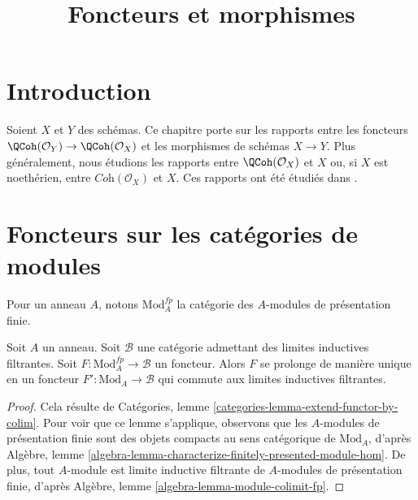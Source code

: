 

%


\title{Foncteurs et morphismes}


\maketitle

\label{section-phantom}

\tableofcontents

\section{Introduction}
\label{section-introduction}

\noindent
Soient $X$ et $Y$ des schémas. Ce chapitre porte sur les rapports
entre les foncteurs $\QCoh(\mathcal{O}_Y) \to \QCoh(\mathcal{O}_X)$ et les
morphismes de schémas $X \to Y$. Plus généralement, nous étudions les
rapports entre $\QCoh(\mathcal{O}_X)$ et $X$ ou, si $X$ est noethérien,
entre $\textit{Coh}(\mathcal{O}_X)$ et $X$.
Ces rapports ont été étudiés dans \cite{Gabriel}.






\section{Foncteurs sur les catégories de modules}
\label{section-preliminary}

\noindent
Pour un anneau $A$, notons $\text{Mod}^{fp}_A$ la catégorie des
$A$-modules de présentation finie.

\begin{lemma}
\label{lemma-functor-on-fp-modules}
Soit $A$ un anneau. Soit $\mathcal{B}$ une catégorie admettant des limites
inductives filtrantes. Soit $F : \text{Mod}^{fp}_A \to \mathcal{B}$ un foncteur. Alors $F$
se prolonge de manière unique en un foncteur $F' : \text{Mod}_A \to \mathcal{B}$
qui commute aux limites inductives filtrantes.
\end{lemma}

\begin{proof}
Cela résulte de
Catégories, lemme \ref{categories-lemma-extend-functor-by-colim}.
Pour voir que ce lemme s'applique, observons que les
$A$-modules de présentation finie sont des
objets compacts au sens catégorique de $\text{Mod}_A$, d'après
Algèbre, lemme \ref{algebra-lemma-characterize-finitely-presented-module-hom}.
De plus, tout $A$-module est limite inductive filtrante
de $A$-modules de présentation finie, d'après
Algèbre, lemme \ref{algebra-lemma-module-colimit-fp}.
\end{proof}

